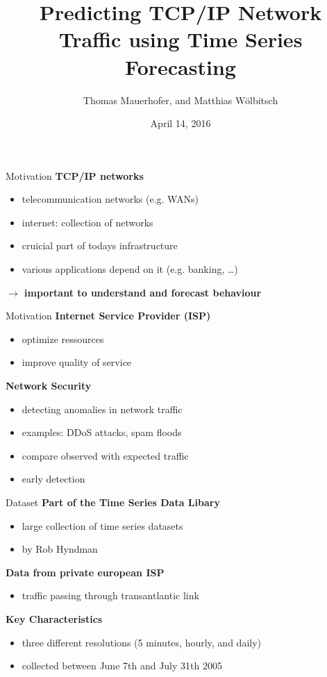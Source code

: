 \documentclass{beamer}
\title{Predicting TCP/IP Network Traffic using Time Series Forecasting}
\date{April 14, 2016}
\author{Thomas Mauerhofer, and Matthias Wölbitsch}
\begin{document}
  \maketitle
  
  \begin{frame}{Motivation}   
    \textbf{TCP/IP networks} 
    \begin{itemize}
      \item telecommunication networks (e.g. WANs)
      \item internet: collection of networks 
      \item cruicial part of todays infrastructure  
      \item various applications depend on it (e.g. banking, \ldots)
    \end{itemize}
    
    \hspace{10pt}
    
    \textbf{\(\rightarrow\) important to understand and forecast behaviour}
  \end{frame}
  
  \begin{frame}{Motivation}
    \textbf{Internet Service Provider (ISP)}
    \begin{itemize}
     \item optimize ressources
     \item improve quality of service
    \end{itemize}
    
    \textbf{Network Security}
    \begin{itemize}
     \item detecting anomalies in network traffic
     \item examples: DDoS attacks, spam floods
     \item compare observed with expected traffic
     \item early detection
    \end{itemize}    
  \end{frame}


  \begin{frame}{Dataset}
    \textbf{Part of the Time Series Data Libary}
    \begin{itemize}
     \item large collection of time series datasets
     \item by Rob Hyndman
    \end{itemize}

    \textbf{Data from private european ISP}
    \begin{itemize}
     \item traffic passing through transantlantic link
    \end{itemize}

    \textbf{Key Characteristics}
    \begin{itemize}
     \item three different resolutions (5 minutes, hourly, and daily)
     \item collected between June 7th and July 31th 2005
    \end{itemize}

  \end{frame}
\end{document}
